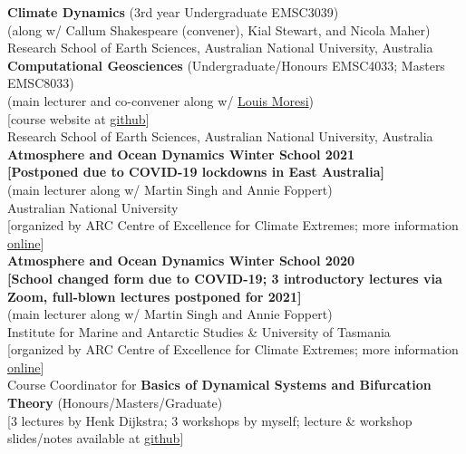 \documentclass[10pt, letter]{article}
\newcommand{\years}[1]{\marginnote{\scriptsize #1}}
\begin{document}
\noindent\years{2024 -- }\textbf{Climate Dynamics} (3rd year Undergraduate EMSC3039)\\
(along w/ Callum Shakespeare (convener), Kial Stewart, and Nicola Maher)\\
Research School of Earth Sciences, Australian National University, Australia\\[.2cm]
\noindent\years{2021 -- 2023}\textbf{Computational Geosciences} (Undergraduate/Honours EMSC4033; Masters EMSC8033)\\
(main lecturer and co-convener along w/ \href{http://www.moresi.info}{\color{black}Louis Moresi})\\[0pt]
[course website at \href{https://github.com/ANU-RSES-Education/EMSC-4033}{github}]\\
Research School of Earth Sciences, Australian National University, Australia\\[.2cm]
\noindent\years{Jun.~2021}\textbf{Atmosphere and Ocean Dynamics Winter School 2021}\\
\textbf{[Postponed due to COVID-19 lockdowns in East Australia]}\\
(main lecturer along w/ Martin Singh and Annie Foppert)\\[0pt] 
Australian National University\\[0pt] 
[organized by ARC Centre of Excellence for Climate Extremes; more information \href{https://climateextremes.org.au/winter-school-2021-atmosphere-and-ocean-dynamics/}{online}]\\[.2cm]
\noindent\years{Jun.~2020}\textbf{Atmosphere and Ocean Dynamics Winter School 2020}\\
\textbf{[School changed form due to COVID-19; 3 introductory lectures via Zoom, full-blown lectures postponed for 2021]}\\
(main lecturer along w/ Martin Singh and Annie Foppert)\\[0pt] 
Institute for Marine and Antarctic Studies \& University of Tasmania\\[0pt] 
[organized by ARC Centre of Excellence for Climate Extremes; more information \href{https://climateextremes.org.au/clex-winter-school-2020-atmosphere-and-ocean-dynamics/}{online}]\\[.2cm]
\noindent\years{2020}Course Coordinator for \textbf{Basics of Dynamical Systems and Bifurcation Theory} (Honours/Masters/Graduate)\\[0pt] [3 lectures by Henk Dijkstra; 3 workshops by myself; lecture \& workshop slides/notes available at \href{https://github.com/ClimateFluidPhysics-ANU/DynamicalSystems-BifurcationTheory}{github}]\\
\end{document}
